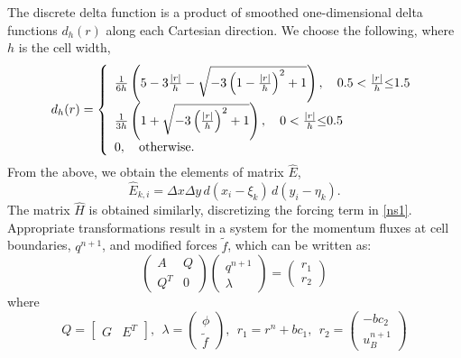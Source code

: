 \documentclass{tufte-handout}
\begin{document}
\noindent
 The discrete delta function is a product of smoothed one-dimensional delta functions $d_h(r)$ along each Cartesian direction. We choose the following, where $h$ is the cell width,\cite{Roma1999}
%
\begin{equation}
	d_{h}(r) = \left \{
\begin{array}{l}
	\frac{1}{6h}\left(5-3\frac{|r|}{h}-\sqrt{-3\left(1-\frac{|r|}{h}\right)^2+1}\right), \quad 0.5<\frac{|r|}{h}{\le}1.5 \notag \\
	\frac{1}{3h}\left(1+\sqrt{-3\left(\frac{|r|}{h}\right)^2+1}\right), \quad 0<\frac{|r|}{h}{\le}0.5 \notag \\
	0, \quad \text{otherwise}.
\end{array}
\right .
\end{equation}
%
From the above, we obtain the elements of matrix $\hat{E}$,
%
\begin{equation}
	\hat{E}_{k,i}=\Delta{x}\Delta{y}\,d(x_i-\xi_k)\,d(y_i-\eta_k).
\end{equation}
%
The matrix $\hat{H}$ is obtained similarly, discretizing the forcing term in \eqref{ns1}. Appropriate transformations result in a system for the momentum fluxes at cell boundaries, $q^{n+1}$, and modified forces $\tilde{f}$, which can be written as: 
%
\begin{equation}\label{eq:newsystem}
	\left(
		\begin{array}{ccc}
			A & Q \\
			Q^T & 0
		\end{array}
	\right)
	\left(
		\begin{array}{c}
			q^{n+1} \\
			\lambda
		\end{array}
	\right)
	=
	\left(
		\begin{array}{c}
			r_1 \\
			r_2
		\end{array}
	\right)
\end{equation}
%
\noindent
where
\begin{equation}
	Q =
	\left[
		\begin{array}{cc}
			G & E^T
		\end{array}
	\right],~~
	\lambda =
	\left(
		\begin{array}{c}
			\phi \\
			\tilde{f}
		\end{array}
	\right),~~
	r_1=r^n+bc_1,~~
	r_2=
	\left(
		\begin{array}{c}
			-bc_2 \\
			u_B^{n+1}
		\end{array}
	\right)
\end{equation}
\end{document}
